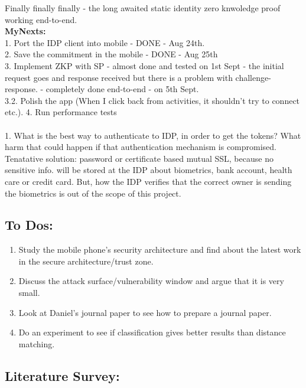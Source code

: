 \documentclass[11pt]{article}
\begin{document}
Finally finally finally - the long awaited static identity zero knwoledge proof working end-to-end.\\

\textbf{MyNexts:}\\
 1. Port the IDP client into mobile - DONE - Aug 24th.\\
 2. Save the commitment in the mobile - DONE - Aug 25th\\
 3. Implement ZKP with SP - almost done and tested on 1st Sept - the initial request goes and response received but there is a problem with 
challenge-response. - completely done end-to-end - on 5th Sept.\\
3.2. Polish the app (When I click back from activities, it shouldn't try to connect etc.).
 4. Run performance tests\\

 \\
 1. What is the best way to authenticate to IDP, in order to get the tokens? What harm that could happen if that authentication mechanism is 
compromised.\\
Tenatative solution: password or certificate based mutual SSL, because no sensitive info. will be stored at the IDP about biometrics, bank account, 
health care or credit card. But, how the IDP verifies that the correct owner is sending the biometrics is out of the scope of this project.\\

\pagebreak
\subsection*{To Dos:}
\begin{enumerate}
 \item Study the mobile phone's security architecture and find about the latest work in the secure architecture/trust zone.
 \item Discuss the attack surface/vulnerability window and argue that it is very small.
 \item Look at Daniel's journal paper to see how to prepare a journal paper.
 \item Do an experiment to see if classification gives better results than distance matching.
\end{enumerate}

\subsection*{Literature Survey:}
\end{document}
